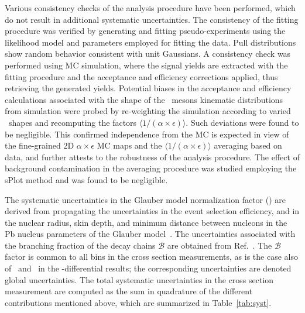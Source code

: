 Various consistency checks of the analysis procedure have been performed, which do not result in additional systematic uncertainties.
%
The consistency of the fitting procedure was verified by generating and fitting pseudo-experiments using the likelihood model and parameters employed for fitting the data. Pull distributions show random behavior consistent with unit Gaussians.
%
A consistency check %
was performed using MC simulation, where the signal yields are extracted with the fitting procedure and the acceptance and efficiency corrections applied, thus retrieving the generated yields. %
%
Potential biases in the acceptance and efficiency calculations associated with the shape of the \PB\ mesons kinematic distributions from simulation were probed by re-weighting the  {\PYTHIA} simulation according to varied \pt\ shapes %
 and recomputing the factors $\langle 1 / (\alpha\!\times\!\epsilon)\rangle$. Such deviations were found to be negligible. 
This confirmed independence from the MC is expected in view of the fine-grained 2D $\alpha\!\times\!\epsilon$ MC maps and the $\langle 1 / (\alpha\!\times\!\epsilon)\rangle$ averaging based on data, and further attests to the robustness of the analysis procedure. 
The effect of background contamination %
in the averaging procedure was studied employing the sPlot method and was found to be negligible.  

%
The systematic uncertainties in the Glauber model normalization factor (\TAA) are derived from propagating the uncertainties in the event selection efficiency, and in the nuclear radius, skin depth, and minimum distance between nucleons in the Pb nucleus parameters of the Glauber model~\cite{Khachatryan:2016odn}. The uncertainties associated with the branching fraction of the decay chains $\mathcal{B}$ are obtained from Ref.~\cite{pdg2018}.
%
The $\mathcal{B}$ factor is common to all bins in the cross section measurements, as is the case also of \TAA\ and \NMB\ in the \pt-differential results; the corresponding uncertainties are denoted global uncertainties.  
%
%
The total systematic uncertainties in the cross section measurement are computed as the sum in quadrature of the different contributions mentioned above, which are summarized in Table~\ref{tab:syst}. 


